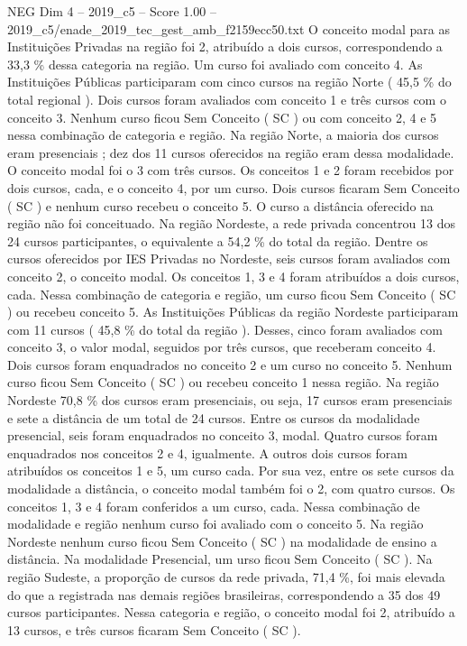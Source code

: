 \begin{textsample}{NEG Dim 4 – 2019\_c5 – Score 1.00 – 2019\_c5/enade\_2019\_tec\_gest\_amb\_f2159ecc50.txt}
O conceito modal para as Instituições Privadas na região foi 2, atribuído a dois cursos, correspondendo a 33,3 \% dessa categoria na região.
Um curso foi avaliado com conceito 4.
As Instituições Públicas participaram com cinco cursos na região Norte ( 45,5 \% do total regional ).
Dois cursos foram avaliados com conceito 1 e três cursos com o conceito 3.
Nenhum curso ficou Sem Conceito ( SC ) ou com conceito 2, 4 e 5 nessa combinação de categoria e região.
Na região Norte, a maioria dos cursos eram presenciais ; dez dos 11 cursos oferecidos na região eram dessa modalidade.
O conceito modal foi o 3 com três cursos.
Os conceitos 1 e 2 foram recebidos por dois cursos, cada, e o conceito 4, por um curso.
Dois cursos ficaram Sem Conceito ( SC ) e nenhum curso recebeu o conceito 5.
O curso a distância oferecido na região não foi conceituado.
Na região Nordeste, a rede privada concentrou 13 dos 24 cursos participantes, o equivalente a 54,2 \% do total da região.
Dentre os cursos oferecidos por IES Privadas no Nordeste, seis cursos foram avaliados com conceito 2, o conceito modal.
Os conceitos 1, 3 e 4 foram atribuídos a dois cursos, cada.
Nessa combinação de categoria e região, um curso ficou Sem Conceito ( SC ) ou recebeu conceito 5.
As Instituições Públicas da região Nordeste participaram com 11 cursos ( 45,8 \% do total da região ).
Desses, cinco foram avaliados com conceito 3, o valor modal, seguidos por três cursos, que receberam conceito 4.
Dois cursos foram enquadrados no conceito 2 e um curso no conceito 5.
Nenhum curso ficou Sem Conceito ( SC ) ou recebeu conceito 1 nessa região.
Na região Nordeste 70,8 \% dos cursos eram presenciais, ou seja, 17 cursos eram presenciais e sete a distância de um total de 24 cursos.
Entre os cursos da modalidade presencial, seis foram enquadrados no conceito 3, modal.
Quatro cursos foram enquadrados nos conceitos 2 e 4, igualmente.
A outros dois cursos foram atribuídos os conceitos 1 e 5, um curso cada.
Por sua vez, entre os sete cursos da modalidade a distância, o conceito modal também foi o 2, com quatro cursos.
Os conceitos 1, 3 e 4 foram conferidos a um curso, cada.
Nessa combinação de modalidade e região nenhum curso foi avaliado com o conceito 5.
Na região Nordeste nenhum curso ficou Sem Conceito ( SC ) na modalidade de ensino a distância.
Na modalidade Presencial, um urso ficou Sem Conceito ( SC ).
Na região Sudeste, a proporção de cursos da rede privada, 71,4 \%, foi mais elevada do que a registrada nas demais regiões brasileiras, correspondendo a 35 dos 49 cursos participantes.
Nessa categoria e região, o conceito modal foi 2, atribuído a 13 cursos, e três cursos ficaram Sem Conceito ( SC ).

\end{textsample}
